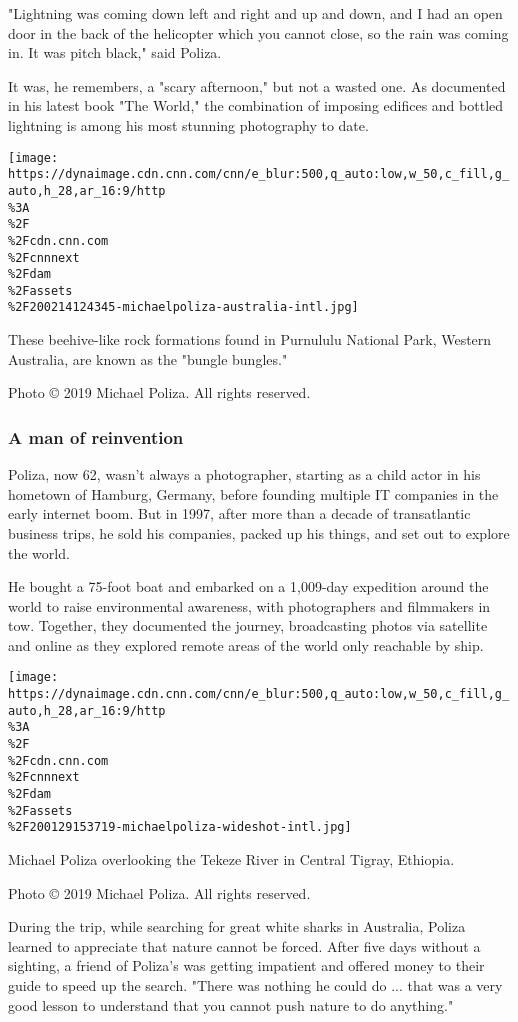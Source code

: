 "Lightning was coming down left and right and up and down, and I had an
open door in the back of the helicopter which you cannot close, so the
rain was coming in. It was pitch black," said Poliza.

It was, he remembers, a "scary afternoon," but not a wasted one. As
documented in his latest book "The World," the combination of imposing
edifices and bottled lightning is among his most stunning photography to
date.

\texttt{[image: https://dynaimage.cdn.cnn.com/cnn/e\_blur:500,q\_auto:low,w\_50,c\_fill,g\_auto,h\_28,ar\_16:9/http\\\%3A\\\%2F\\\%2Fcdn.cnn.com\\\%2Fcnnnext\\\%2Fdam\\\%2Fassets\\\%2F200214124345-michaelpoliza-australia-intl.jpg]}

These beehive-like rock formations found in Purnululu National Park,
Western Australia, are known as the "bungle bungles."

Photo © 2019 Michael Poliza. All rights reserved.

\hypertarget{a-man-of-reinvention}{%
\subsubsection{A man of reinvention}\label{a-man-of-reinvention}}

Poliza, now 62, wasn't always a photographer, starting as a child actor
in his hometown of Hamburg, Germany, before founding multiple IT
companies in the early internet boom. But in 1997, after more than a
decade of transatlantic business trips, he sold his companies, packed up
his things, and set out to explore the world.

He bought a 75-foot boat and embarked on a 1,009-day expedition around
the world to raise environmental awareness, with photographers and
filmmakers in tow. Together, they documented the journey, broadcasting
photos via satellite and online as they explored remote areas of the
world only reachable by ship.

\texttt{[image: https://dynaimage.cdn.cnn.com/cnn/e\_blur:500,q\_auto:low,w\_50,c\_fill,g\_auto,h\_28,ar\_16:9/http\\\%3A\\\%2F\\\%2Fcdn.cnn.com\\\%2Fcnnnext\\\%2Fdam\\\%2Fassets\\\%2F200129153719-michaelpoliza-wideshot-intl.jpg]}

Michael Poliza overlooking the Tekeze River in Central Tigray, Ethiopia.

Photo © 2019 Michael Poliza. All rights reserved.

During the trip, while searching for great white sharks in Australia,
Poliza learned to appreciate that nature cannot be forced. After five
days without a sighting, a friend of Poliza's was getting impatient and
offered money to their guide to speed up the search. "There was nothing
he could do ... that was a very good lesson to understand that you
cannot push nature to do anything."

